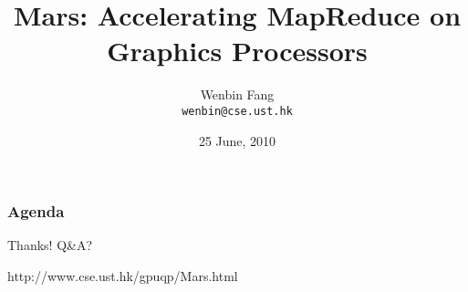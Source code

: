 \documentclass[handout, 24pt]{beamer}
\title{Mars: Accelerating MapReduce on Graphics Processors}
\author{Wenbin Fang \\ \texttt{wenbin@cse.ust.hk}}
\institute{HKUST}
\date{25 June, 2010}
\begin{document}
\begin{frame}
\titlepage
\end{frame}



\begin{frame}
\frametitle{Agenda}
\tableofcontents
\end{frame}











\begin{frame}
Thanks! Q\&A?


http://www.cse.ust.hk/gpuqp/Mars.html
\end{frame}
\end{document}
